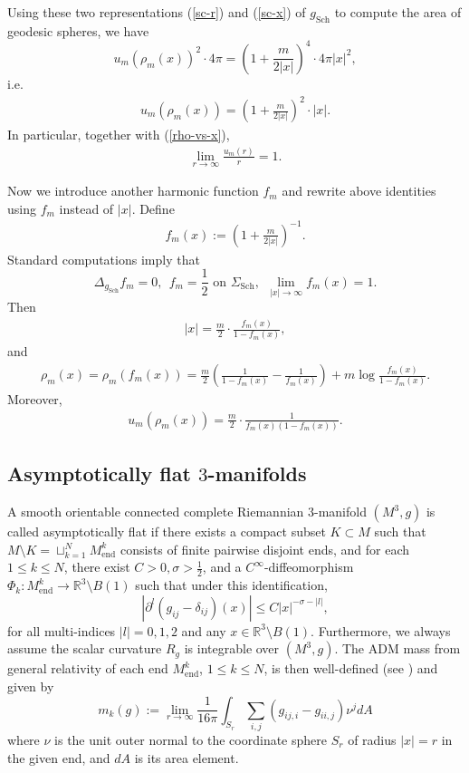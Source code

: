 \documentclass[letter]{amsart}
\theoremstyle{definition}
\theoremstyle{remark}
\begin{document}
Using these two representations (\ref{sc-r}) and (\ref{sc-x}) of $g_{\mathrm{Sch}}$ to compute the area of geodesic spheres, we have 
$$
u_m(\rho _m(x) ) ^2 \cdot 4\pi = \left( 1+ \frac{m}{2|x|} \right) ^{4} \cdot 4\pi |x|^2,
$$ 
i.e.
\begin{align}\label{u-vs-x}
u_m(\rho _m(x) ) = \left( 1+ \frac{m}{2|x|} \right) ^2\cdot |x|.
\end{align} 
In particular, together with (\ref{rho-vs-x}),
\begin{align}
\lim_{r\to \infty} \frac{u_m(r)}{r} =1.
\end{align}

Now we introduce another harmonic function $f_m$ and rewrite above identities using $f_m$ instead of $|x|$. Define
\begin{align*}
	f_m(x) := \left( 1+ \frac{m}{2|x|} \right) ^{-1}.
\end{align*}
Standard computations imply that 
$$
\Delta _{g_{\mathrm{Sch}}} f_m =0,\ \ f_m = \frac{1}{2} \text{ on } \Sigma_{\mathrm{Sch}},\ \ \lim_{|x|\to \infty}f_m(x)= 1. 
$$ 
Then
\begin{align*}
	|x| = \frac{m}{2}\cdot \frac{f_m(x)}{1- f_m(x)},
\end{align*}
and
\begin{align}\label{rho-f}
	\rho _m(x) = \rho _m(f_m(x) ) = \frac{m}{2} \left( \frac{1}{1-f_m(x)} - \frac{1}{f_m(x)} \right) + m \log \frac{f_m(x)}{1- f_m(x)}.
\end{align}
Moreover,
\begin{align}\label{u-f}
	u_m(\rho _m(x) ) = \frac{m}{2}\cdot \frac{1}{f_m(x) (1- f_m(x) )}.
\end{align}

\subsection{Asymptotically flat $3$-manifolds}
A smooth orientable connected complete Riemannian $3$-manifold $(M^3, g)$ is called asymptotically flat if there exists a compact subset $K \subset M$ such that $M\setminus K= \sqcup_{k=1}^{N} M_{\mathrm{end}}^k$ consists of finite pairwise disjoint ends, and for each $1\leq k \leq N$, there exist $C>0, \sigma > \frac{1}{2}$, and a $C^\infty$-diffeomorphism $\Phi_k : M_{\mathrm{end}}^k \to  \mathbb{R}^3 \setminus B(1)$ such that under this identification, 
	$$
	| \partial ^{l}(g_{ij}- \delta _{ij})(x)| \leq C|x|^{-\sigma - |l|},
	$$ for all multi-indices $|l|=0,1,2$ and any $x \in \mathbb{R}^3\setminus B(1)$.
	Furthermore, we always assume the scalar curvature $R_g$ is integrable over $(M^3,g)$. The ADM mass from general relativity of each end $M_{\mathrm{end}}^{k}$, $1\leq k \leq N$, is then well-defined (see \cite{ADM'61, Bartnik'86}) and given by
	$$m_k(g):= \lim_{r\to \infty} \frac{1}{16\pi} \int_{S_r} \sum_{i,j} (g_{ij,i}-g_{ii,j}) \nu ^j dA$$
where $\nu $ is the unit outer normal to the coordinate sphere $S_r$ of radius $|x|=r$ in the given end, and $dA$ is its area element. 
\end{document}
